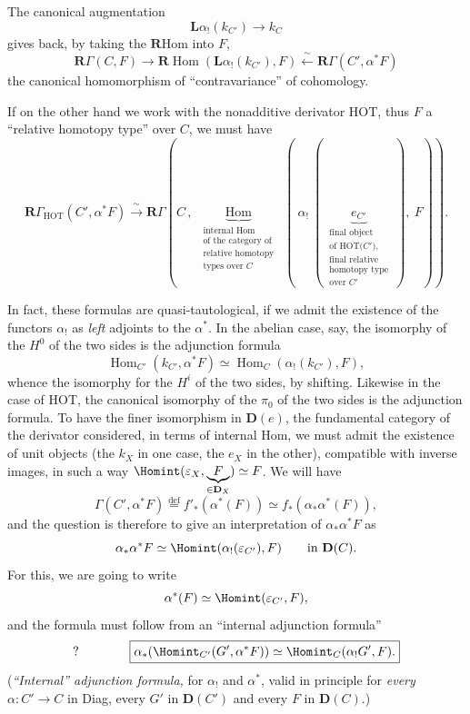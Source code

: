 The canonical augmentation
\[ \mathbf{L}\alpha_!(k_{C'}) \longrightarrow k_C \]
gives back, by taking the $\mathbf{R}\mathrm{Hom}$ into $F$,
\[ \mathbf{R}\Gamma(C,F) \longrightarrow \mathbf{R}\operatorname{Hom}(\mathbf{L}\alpha_!(k_{C'}), F) \xleftarrow{\ \sim\ } \mathbf{R}\Gamma(C', \alpha^*F) \]
the canonical homomorphism of ``contravariance'' of cohomology.

If on the other hand we work with the nonadditive derivator HOT, thus $F$ a ``relative homotopy type'' over $C$, we must have
\[ \boxed{\mathbf{R}\Gamma_{\mathrm{HOT}}(C', \alpha^*F) \xrightarrow{\ \sim\ } \mathbf{R}\Gamma(C\,,\ \underbrace{\operatorname{Hom}}_{\substack{\text{internal Hom}\\ \text{of the category of}\\ \text{relative homotopy}\\ \text{types over $C$}}}\ (\ \alpha_!\ (\ \underbrace{e_{C'}}_{\substack{\text{final object}\\ \text{of HOT($C'$),}\\ \text{final relative}\\ \text{homotopy type}\\ \text{over $C'$}}}\ ),\ F)).} \]

In fact, these formulas are quasi-tautological, if we admit the existence of the functors $\alpha_!$ as \textit{left} adjoints to the $\alpha^*$. In the abelian case, say,
the isomorphy of the $H^0$ of the two sides is the adjunction formula
\[ \operatorname{Hom}_{C'}(k_{C'}, \alpha^*F) \simeq \operatorname{Hom}_C(\alpha_!(k_{C'}), F), \]
whence the isomorphy for the $H^i$ of the two sides, by shifting. Likewise in the case of HOT, the canonical isomorphy of the $\pi_0$ of the two sides is the adjunction formula. To have the finer isomorphism in $\mathbf{D}(e)$, the fundamental category of the derivator considered, in terms of internal Hom, we must admit the existence of unit objects (the $k_X$ in one case, the $e_X$ in the other), compatible with inverse images, in such a way $\Homint(\varepsilon_X, \underbrace{F}_{\in\mathbf{D}_X}) \simeq F$. We will have
\[ \Gamma(C', \alpha^*F) \overset{\text{def}}{=} f'_*(\alpha^*(F)) \simeq f_*(\alpha_*\alpha^*(F)), \]
and the question is therefore to give an interpretation of $\alpha_*\alpha^*F$ as
\[ \alpha_*\alpha^*F \simeq \Homint(\alpha_!(\varepsilon_{C'}), F) \qquad \text{in } \mathbf{D}(C). \]
For this, we are going to write
\[ \alpha^*(F) \simeq \Homint(\varepsilon_{C'}, F), \]
and the formula must follow from an ``internal adjunction formula''
\[ ? \qquad\qquad \boxed{\alpha_*(\Homint_{C'}(G', \alpha^*F)) \simeq \Homint_C(\alpha_!G', F).} \]
(\textit{``Internal'' adjunction formula,} for $\alpha_!$ and $\alpha^*$, valid in principle for \textit{every} $\alpha : C' \longrightarrow C$ in Diag, every $G'$ in $\mathbf{D}(C')$ and every $F$ in $\mathbf{D}(C)$.)

